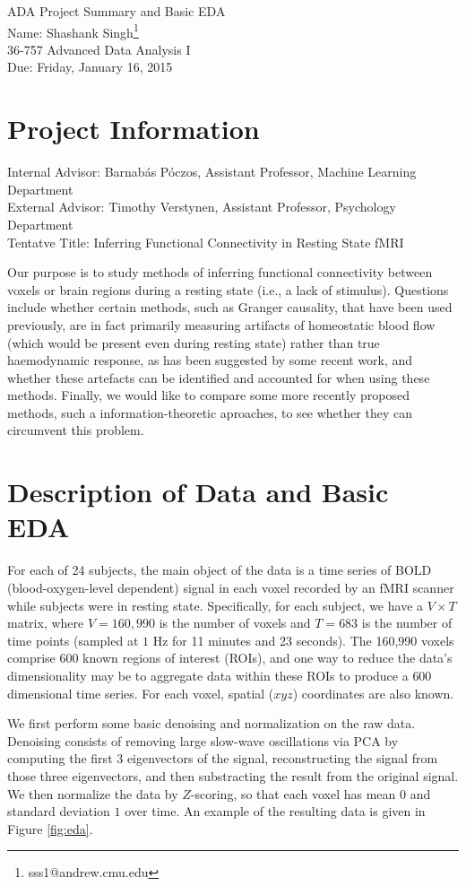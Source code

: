 \documentclass[11pt]{article}
\makeatletter
\newcommand{\myname}{Shashank Singh\footnote{sss1@andrew.cmu.edu}}
\newcommand{\myclass}{36-757 Advanced Data Analysis I}
\newcommand{\myhwname}{ADA Project Summary and Basic EDA}
\newcommand{\duedate}{Friday, January 16, 2015}
\makeatother
\begin{document}
\thispagestyle{plain}

{\Large \myhwname} \\
Name: \myname \\
\myclass \\
Due: \duedate

\section{Project Information}
Internal Advisor: Barnab\'as P\'oczos, Assistant Professor, Machine Learning Department  \\
External Advisor: Timothy Verstynen, Assistant Professor, Psychology Department  \\
Tentatve Title: Inferring Functional Connectivity in Resting State fMRI

Our purpose is to study methods of inferring functional connectivity between
voxels or brain regions during a resting state (i.e., a lack of stimulus).
Questions include whether certain methods, such as Granger causality, that have
been used previously, are in fact primarily measuring artifacts of homeostatic
blood flow (which would be present even during resting state) rather than true
haemodynamic response, as has been suggested by some recent work, and whether
these artefacts can be identified and accounted for when using these methods.
Finally, we would like to compare some more recently proposed methods, such a
information-theoretic aproaches, to see whether they can circumvent this
problem.

\section{Description of Data and Basic EDA}
For each of 24 subjects, the main object of the data is a time series of BOLD
(blood-oxygen-level dependent) signal in each voxel recorded by an fMRI scanner
while subjects were in resting state. Specifically, for each subject, we have a
$V \times T$ matrix, where $V = 160,990$ is the number of voxels and $T = 683$
is the number of time points (sampled at $1$ Hz for 11 minutes and 23 seconds).
The 160,990 voxels comprise $600$ known regions of interest (ROIs), and one way
to reduce the data's dimensionality may be to aggregate data within these ROIs
to produce a $600$ dimensional time series. For each voxel, spatial ($xyz$)
coordinates are also known.

We first perform some basic denoising and normalization on the raw data.
Denoising consists of removing large slow-wave oscillations via PCA by
computing the first $3$ eigenvectors of the signal, reconstructing the signal
from those three eigenvectors, and then substracting the result from the
original signal. We then normalize the data by $Z$-scoring, so that each voxel
has mean $0$ and standard deviation $1$ over time. An example of the resulting
data is given in Figure \ref{fig:eda}.
\end{document}
